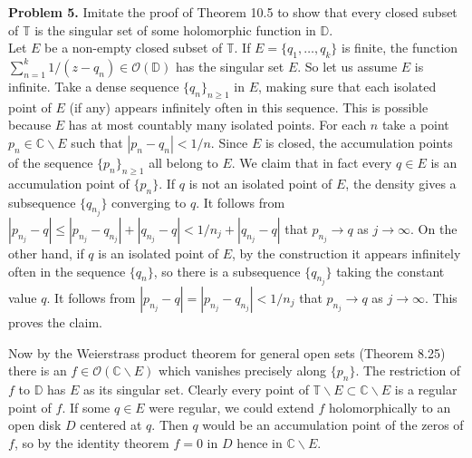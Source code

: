 \documentclass[12pt]{amsart}
\newcommand{\sm}{\smallsetminus}
\newcommand{\OO}{{\mathcal O}}
\newcommand{\CC}{{\mathbb C}}
\newcommand{\TT}{{\mathbb T}}
\newcommand{\DD}{{\mathbb D}}
\newcommand{\vs}{\vspace{2mm}}
\begin{document}
\vs \vs 

\noindent
{\bf Problem 5.} Imitate the proof of Theorem 10.5 to show that every closed subset of $\TT$ is the singular set of some holomorphic function in $\DD$. \vs \\
Let $E$ be a non-empty closed subset of $\TT$. If $E=\{ q_1, \ldots, q_k \}$ is finite, the function $\sum_{n=1}^k 1/(z-q_n) \in \OO(\DD)$ has the singular set $E$. So let us assume $E$ is infinite. Take a dense sequence $\{ q_n \}_{n \geq 1}$ in $E$, making sure that each isolated point of $E$ (if any) appears infinitely often in this sequence. This is possible because $E$ has at most countably many isolated points. For each $n$ take a point $p_n \in \CC \sm E$ such that $|p_n-q_n|<1/n$. Since $E$ is closed, the accumulation points of the sequence $\{ p_n \}_{n \geq 1}$ all belong to $E$. We claim that in fact every $q \in E$ is an accumulation point of $\{ p_n \}$. If $q$ is not an isolated point of $E$, the density gives a subsequence $\{ q_{n_j} \}$ converging to $q$. It follows from $|p_{n_j}-q| \leq |p_{n_j}-q_{n_j}|+|q_{n_j}-q|<1/n_j + |q_{n_j}-q|$ that $p_{n_j} \to q$ as $j \to \infty$. On the other hand, if $q$ is an isolated point of $E$, by the construction it appears infinitely often in the sequence $\{ q_n \}$, so there is a subsequence $\{ q_{n_j} \}$ taking the constant value $q$. It follows from $|p_{n_j}-q|=|p_{n_j}-q_{n_j}|<1/n_j$ that $p_{n_j} \to q$ as $j \to \infty$. This proves the claim. \vs

Now by the Weierstrass product theorem for general open sets (Theorem 8.25) there is an $f \in \OO(\CC \sm E)$ which vanishes precisely along $\{ p_n \}$. The restriction of $f$ to $\DD$ has $E$ as its singular set. Clearly every point of $\TT \sm E \subset \CC \sm E$ is a regular point of $f$. If some $q \in E$ were regular, we could extend $f$ holomorphically to an open disk $D$ centered at $q$. Then $q$ would be an accumulation point of the zeros of $f$, so by the identity theorem $f=0$ in $D$ hence in $\CC \sm E$.  \\  
\end{document}

